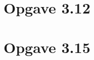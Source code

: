 \documentclass[../main.tex]{subfiles}
\begin{document}
\section{Opgave 3.12}


\section{Opgave 3.15}
\end{document}
